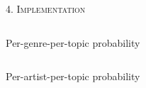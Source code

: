 \documentclass[fleqn,final]{beamer}
\begin{document}
\begin{frame}
\begin{columns}[t]
\begin{column}{.46\linewidth}
\begin{block}{\rule[-2.5mm]{0cm}{1cm}\textsc{4. Implementation}}
\begin{columns}[t]
\begin{column}{.47\linewidth}
{\begin{block}{\small{Per-genre-per-topic probability}}
\end{block}
}
\end{column}
\end{columns}


\begin{column}{.98\linewidth}
\begin{block}{\small{Per-artist-per-topic probability}}
\begin{figure}[H]
\centering
\end{figure}
\begin{figure}[H]
\centering
{}
\end{figure}



\end{block}
\end{column}
\end{block}
\end{column}
\end{columns}
\end{frame}
\end{document}

